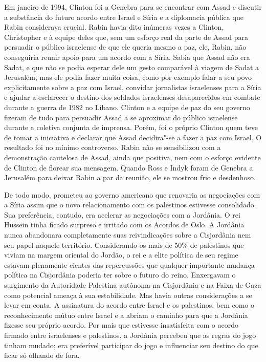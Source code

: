 Em janeiro de 1994, Clinton foi a Genebra para se encontrar com Assad e
discutir a substância do futuro acordo entre Israel e Síria e a
diplomacia pública que Rabin considerava crucial. Rabin havia dito
inúmeras vezes a Clinton, Christopher e à equipe deles que, sem um
esforço real da parte de Assad para persuadir o público israelense de que
ele queria mesmo a paz, ele, Rabin, não conseguiria reunir apoio para um
acordo com a Síria. Sabia que Assad não era Sadat, e que não se podia
esperar dele um gesto comparável à viagem de Sadat a Jerusalém, mas ele
podia fazer muita coisa, como por exemplo falar a seu povo
explicitamente sobre a paz com Israel, convidar jornalistas israelenses
para a Síria e ajudar a esclarecer o destino dos soldados israelenses
desaparecidos em combate durante a guerra de 1982 no Líbano. Clinton e a
equipe de paz do seu governo fizeram de tudo para persuadir Assad a se aproximar
do público israelense durante a coletiva conjunta de imprensa. Porém,
foi o próprio Clinton quem teve de tomar a iniciativa e declarar que Assad
decidira"-se a fazer a paz com Israel. O resultado foi no mínimo
controverso. Rabin não se sensibilizou com a demonstração cautelosa de
Assad, ainda que positiva, nem com o esforço evidente de Clinton de
florear sua mensagem. Quando Ross e Indyk foram de Genebra a Jerusalém
para deixar Rabin a par da reunião, ele se mostrou frio e desdenhoso.

De todo modo, prometeu ao governo americano que renovaria as negociações
com a Síria assim que o novo relacionamento com os palestinos estivesse
consolidado. Sua preferência, contudo, era acelerar as negociações com a
Jordânia. O rei Hussein tinha ficado surpreso e irritado com os Acordos
de Oslo. A Jordânia nunca abandonara completamente suas reivindicações
sobre a Cisjordânia nem seu papel naquele território. Considerando os
mais de 50\% de palestinos que viviam na margem oriental
do Jordão, o rei e a elite política de seu regime estavam plenamente
cientes das repercussões que qualquer importante mudança política na
Cisjordânia poderia ter sobre o futuro do reino. Enxergavam o surgimento
da Autoridade Palestina autônoma na Cisjordânia e na Faixa de Gaza como
potencial ameaça à sua estabilidade. Mas havia outras considerações a se
levar em conta. A assinatura do acordo entre Israel e os palestinos, bem como o
reconhecimento mútuo entre Israel e a  abriam o caminho para que a
Jordânia fizesse seu próprio acordo. Por mais que estivesse insatisfeita
com o acordo firmado entre israelenses e palestinos, a Jordânia percebeu
que as regras do jogo tinham mudado; era preferível participar do jogo e
influenciar seu destino do que ficar só olhando de fora.

